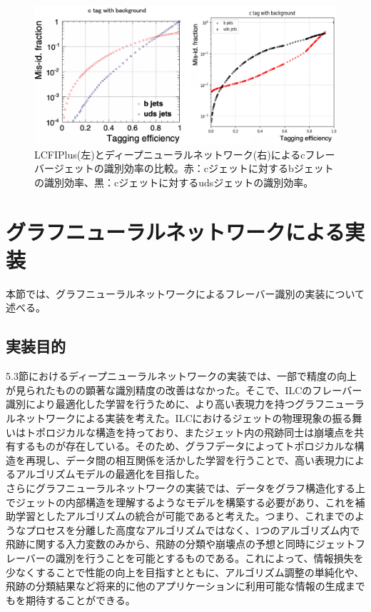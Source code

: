 \begin{figure}[H]
	\begin{center}
 \includegraphics[keepaspectratio, scale=0.3]
 	{Figure/Flavortagging/dnneff_c.png}
 		\caption{LCFIPlus(左)とディープニューラルネットワーク(右)によるcフレーバージェットの識別効率の比較。赤：cジェットに対するbジェットの識別効率、黒：cジェットに対するudsジェットの識別効率。}
 		\label{dnneff_c}
	\end{center}
\end{figure}
\section{グラフニューラルネットワークによる実装}
本節では、グラフニューラルネットワークによるフレーバー識別の実装について述べる。
\subsection{実装目的}
5.3節におけるディープニューラルネットワークの実装では、一部で精度の向上が見られたものの顕著な識別精度の改善はなかった。そこで、ILCのフレーバー識別により最適化した学習を行うために、より高い表現力を持つグラフニューラルネットワークによる実装を考えた。ILCにおけるジェットの物理現象の振る舞いはトポロジカルな構造を持っており、またジェット内の飛跡同士は崩壊点を共有するものが存在している。そのため、グラフデータによってトポロジカルな構造を再現し、データ間の相互関係を活かした学習を行うことで、高い表現力によるアルゴリズムモデルの最適化を目指した。\\
さらにグラフニューラルネットワークの実装では、データをグラフ構造化する上でジェットの内部構造を理解するようなモデルを構築する必要があり、これを補助学習としたアルゴリズムの統合が可能であると考えた。つまり、これまでのようなプロセスを分離した高度なアルゴリズムではなく、1つのアルゴリズム内で飛跡に関する入力変数のみから、飛跡の分類や崩壊点の予想と同時にジェットフレーバーの識別を行うことを可能とするものである。これによって、情報損失を少なくすることで性能の向上を目指すとともに、アルゴリズム調整の単純化や、飛跡の分類結果など将来的に他のアプリケーションに利用可能な情報の生成までもを期待することができる。
